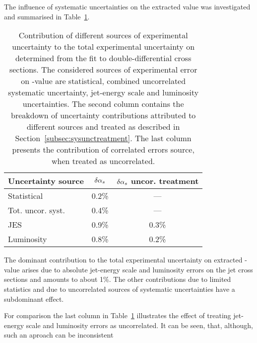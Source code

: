 The influence of systematic uncertainties on the extracted \asz value was investigated and summarised in Table~\ref{tab:asuncbreakdown}.
\begin{table}
\centering
\begin{tabular}{|l|c|c|}
 \hline
 Uncertainty source & $\delta\mbox{$\alpha_{s}$}$ & $\delta\mbox{$\alpha_{s}$}$ uncor. treatment\\
 \hline\hline
 Statistical       & 0.2\% & ---     \\
 Tot. uncor. syst. & 0.4\% & ---     \\
 JES               & 0.9\% & 0.3\%   \\
 Luminosity        & 0.8\% & 0.2\%   \\
 \hline
\end{tabular}
\caption{Contribution of different sources of experimental uncertainty to the total experimental uncertainty on \asz determined from the fit to double-differential cross sections. The considered sources of experimental error on \asz-value are statistical, combined uncorrelated systematic uncertainty, jet-energy scale and luminosity uncertainties. The second column contains the breakdown of uncertainty contributions attributed to different sources and treated as described in Section~\ref{subsec:sysunctreatment}. The last column presents the contribution of correlated errors source, when treated as uncorrelated.}
\label{tab:asuncbreakdown}
\end{table}

The dominant contribution to the total experimental uncertainty on extracted \as-value arises due to absolute jet-energy scale and luminosity errors on the jet cross sections and amounts to about 1\%. The other contributions due to limited statistics and due to uncorrelated sources of systematic uncertainties have a subdominant effect. 

For comparison the last column in Table~\ref{tab:asuncbreakdown} illustrates the effect of treating jet-energy scale and luminosity errors as uncorrelated. It can be seen, that, although, such an aproach can be inconsistent